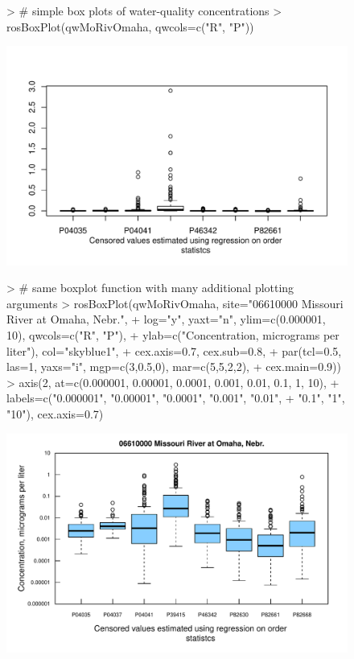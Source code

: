 \documentclass[11pt]{article}
\begin{document}
\begin{figure}[H]
\centering
\begin{Schunk}
\begin{Sinput}
> # simple box plots of water-quality concentrations
> rosBoxPlot(qwMoRivOmaha, qwcols=c("R", "P"))
\end{Sinput}
\end{Schunk}
\includegraphics{vignette-004}
\end{figure}

\begin{figure}[H]
\centering
\begin{Schunk}
\begin{Sinput}
> # same boxplot function with many additional plotting arguments
> rosBoxPlot(qwMoRivOmaha, site="06610000 Missouri River at Omaha, Nebr.",
+                      log="y", yaxt="n", ylim=c(0.000001, 10), qwcols=c("R", "P"), 
+                      ylab=c("Concentration, micrograms per liter"), col="skyblue1",
+                      cex.axis=0.7, cex.sub=0.8, 
+                      par(tcl=0.5, las=1, yaxs="i", mgp=c(3,0.5,0), mar=c(5,5,2,2), 
+                      cex.main=0.9))
> axis(2, at=c(0.000001, 0.00001, 0.0001, 0.001, 0.01, 0.1, 1, 10),
+ labels=c("0.000001", "0.00001", "0.0001", "0.001", "0.01",
+ "0.1", "1", "10"), cex.axis=0.7)
\end{Sinput}
\end{Schunk}
\includegraphics{vignette-005}
\end{figure}
\end{document}

